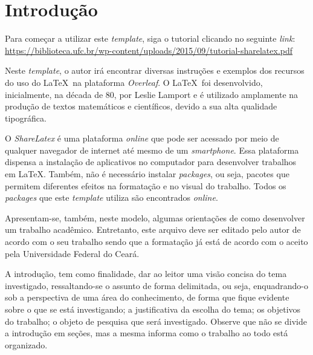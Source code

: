 \chapter{Introdução}\label{cap:introducao}


Para começar a utilizar este \textit{template}, siga o tutorial clicando no seguinte \textit{link}:
\url{https://biblioteca.ufc.br/wp-content/uploads/2015/09/tutorial-sharelatex.pdf}

Neste \textit{template}, o autor irá encontrar diversas instruções e exemplos dos recursos do uso do \LaTeX~na plataforma \textit{Overleaf}. O \LaTeX~foi desenvolvido, inicialmente, na década de 80, por Leslie Lamport e é utilizado amplamente na produção de textos matemáticos e científicos, devido a sua alta qualidade tipográfica. 

O \textit{ShareLatex} é uma plataforma \textit{online} que pode ser acessado por meio de qualquer navegador de internet até mesmo de um \textit{smartphone}. Essa plataforma dispensa a instalação de aplicativos no computador para desenvolver trabalhos em \LaTeX. Também, não é necessário instalar \textit{packages}, ou seja, pacotes que permitem diferentes efeitos na formatação e no visual do trabalho. Todos os \textit{packages} que este \textit{template} utiliza são encontrados \textit{online}. 

Apresentam-se, também, neste modelo, algumas orientações de como desenvolver um trabalho acadêmico. Entretanto, este arquivo deve ser editado pelo autor de acordo com o seu trabalho sendo que a formatação já está de acordo com o aceito pela Universidade Federal do Ceará.  

A introdução, tem como finalidade, dar ao leitor uma visão concisa do tema investigado, ressaltando-se o assunto de forma delimitada, ou seja, enquadrando-o sob a perspectiva de uma área do conhecimento, de forma que fique evidente sobre o que se está investigando; a justificativa da escolha do tema; os objetivos do trabalho; o objeto de pesquisa que será investigado. Observe que não se divide a introdução em seções, mas a mesma informa como o trabalho ao todo está organizado.




